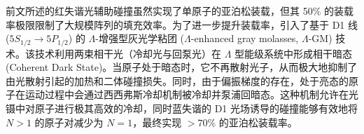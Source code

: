 \documentclass[../main.tex]{subfiles}
\begin{document}

前文所述的红失谐光辅助碰撞虽然实现了单原子的亚泊松装载，但其 50\% 的装载率极限限制了大规模阵列的填充效率。为了进一步提升装载率，引入了基于 D1 线 ($5S_{1/2} \rightarrow 5P_{1/2}$) 的 $\Lambda$-增强型灰光学粘团 ($\Lambda$-enhanced gray molasses, $\Lambda$-GM) 技术。该技术利用两束相干光（冷却光与回泵光）在 $\Lambda$ 型能级系统中形成相干暗态 (Coherent Dark State)。当原子处于暗态时，它不再散射光子，从而极大地抑制了由光散射引起的加热和二体碰撞损失。同时，由于偏振梯度的存在，处于亮态的原子在运动过程中会通过西西弗斯冷却机制被冷却并泵浦回暗态。这种机制允许在光镊中对原子进行极其高效的冷却，同时蓝失谐的 D1 光场诱导的碰撞能够有效地将 $N>1$ 的原子对减少为 $N=1$，最终实现 $>70\%$ 的亚泊松装载率。
\end{document}
